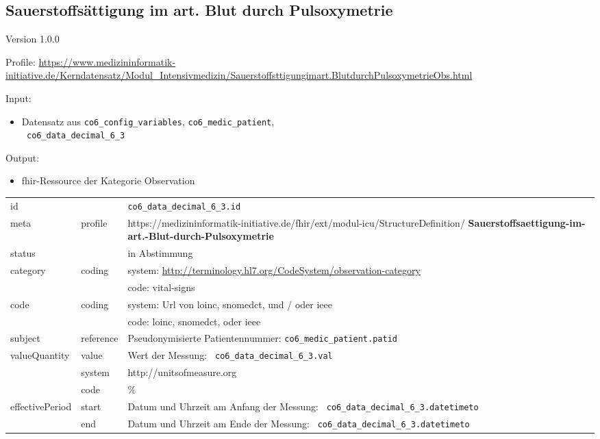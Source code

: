 \subsection{Sauerstoffsättigung im art. Blut durch Pulsoxymetrie} 
\noindent Version 1.0.0

\noindent Profile: \url{https://www.medizininformatik-initiative.de/Kerndatensatz/Modul_Intensivmedizin/Sauerstoffsttigungimart.BlutdurchPulsoxymetrieObs.html}

\noindent Input:
\begin{itemize}
	\item Datensatz aus \texttt{co6\_config\_variables}, \texttt{co6\_medic\_patient}, \\ \texttt{
co6\_data\_decimal\_6\_3}
\end{itemize}
Output:
\begin{itemize}
        \item \ac{fhir}-Ressource der Kategorie \glqq Observation\grqq{}
\end{itemize}
\begin{longtable}{|l|l|p{7.5cm}|}
        \hline
        \rowcolor{lightgray} \multicolumn{3}{|l|}{Data Mapping (inhaltlich)} \\ \hline
        id &  & \texttt{co6\_data\_decimal\_6\_3.id} \\ \hline
	meta & profile & https://medizininformatik-initiative.de/fhir/ext/modul-icu/StructureDefinition/\textbf{
Sauerstoffsaettigung-im-art.-Blut-durch-Pulsoxymetrie} \\ \hline 
	status &  & in Abstimmung  \\ \hline 
	category & coding & system: \url{http://terminology.hl7.org/CodeSystem/observation-category} \\
\cline{3-3}
	& & code: vital-signs \\ \hline
	code & coding & system: Url von \ac{loinc}, \ac{snomedct}, und / oder \ac{ieee} \\ 
	\cline{3-3} 
	 &  & code: \ac{loinc}, \ac{snomedct}, oder \ac{ieee} \\ \hline
	subject & reference & Pseudonymisierte Patientennummer: \texttt{co6\_medic\_patient.patid} \\ \hline
	valueQuantity & value & Wert der Messung: \texttt{
co6\_data\_decimal\_6\_3.val} \\
        \cline{2-3}
         & system & http://unitsofmeasure.org \\
         \cline{2-3}
         & code & \% \\ \hline
    effectivePeriod & start & Datum und Uhrzeit am Anfang der Messung: \texttt{
co6\_data\_decimal\_6\_3.datetimeto} \\
    \cline{2-3}
     & end & Datum und Uhrzeit am Ende der Messung: \texttt{
co6\_data\_decimal\_6\_3.datetimeto} \\ \hline
\end{longtable}


